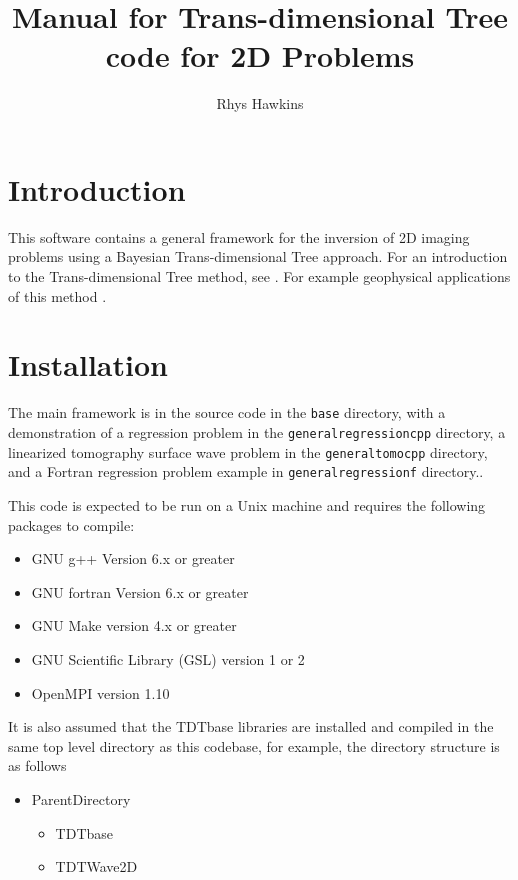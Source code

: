 \documentclass[a4paper,12pt]{article}
\begin{document}
\title{Manual for Trans-dimensional Tree code for 2D Problems}
\author{Rhys Hawkins}

\maketitle

\tableofcontents

\section{Introduction}

This software contains a general framework for the inversion of 2D imaging
problems using a Bayesian Trans-dimensional Tree approach. For an
introduction to the Trans-dimensional Tree method, see \citet{Hawkins:2015:A}.
For example geophysical applications of this method \citep{Dettmer:2016:A,Hawkins:2017:A}.

\section{Installation}

The main framework is in the source code in the {\tt base} directory, with a
demonstration of a regression problem in the {\tt generalregressioncpp} directory,
a linearized tomography surface wave problem in the {\tt generaltomocpp} directory,
and a Fortran regression problem example in {\tt generalregressionf} directory..

This code is expected to be run on a Unix machine and requires the
following packages to compile:

\begin{itemize}
\item GNU g++ Version 6.x or greater
\item GNU fortran Version 6.x or greater
\item GNU Make version 4.x or greater
\item GNU Scientific Library (GSL) version 1 or 2
\item OpenMPI version 1.10
\end{itemize}

It is also assumed that the TDTbase libraries are installed and
compiled in the same top level directory as this codebase, for
example, the directory structure is as follows

\begin{itemize}
\item ParentDirectory
  \begin{itemize}
  \item TDTbase
  \item TDTWave2D
  \end{itemize}
\end{itemize}
\end{document}
